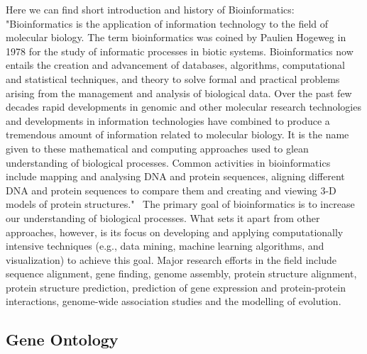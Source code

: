 \documentclass[a4paper,oneside]{article}
\begin{document}
Here we can find short introduction and history of Bioinformatics: "Bioinformatics is the application of information technology to the field of molecular biology. The term bioinformatics was coined by Paulien Hogeweg in 1978 for the study of informatic processes in biotic systems. Bioinformatics now entails the creation and advancement of databases, algorithms, computational and statistical techniques, and theory to solve formal and practical problems arising from the management and analysis of biological data. Over the past few decades rapid developments in genomic and other molecular research technologies and developments in information technologies have combined to produce a tremendous amount of information related to molecular biology. It is the name given to these mathematical and computing approaches used to glean understanding of biological processes. Common activities in bioinformatics include mapping and analysing DNA and protein sequences, aligning different DNA and protein sequences to compare them and creating and viewing 3-D models of protein structures."~\cite{Bioinformatic}
The primary goal of bioinformatics is to increase our understanding of biological processes. What sets it apart from other approaches, however, is its focus on developing and applying computationally intensive techniques (e.g., data mining, machine learning algorithms, and visualization) to achieve this goal. Major research efforts in the field include sequence alignment, gene finding, genome assembly, protein structure alignment, protein structure prediction, prediction of gene expression and protein-protein interactions, genome-wide association studies and the modelling of evolution.

\subsection{Gene Ontology}
\label{gene_ontology}
\end{document}
